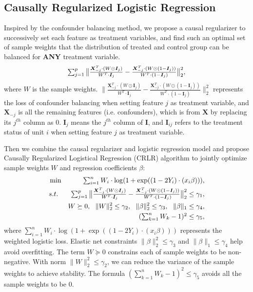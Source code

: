 \documentclass[sigconf]{acmart}
\newcommand*{\Scale}[2][4]{\scalebox{#1}{$#2$}}
\begin{document}
\subsection{Causally Regularized Logistic Regression}\label{sec:CRLR}
Inspired by the confounder balancing method, we propose a causal regularizer to successively set each feature as treatment variables, and find such an optimal set of sample weights that the distribution of treated and control group can be balanced for \textbf{ANY} treatment variable.
\begin{eqnarray}
    \label{causal_regularizer}
    \Scale[1.0]{\sum_{j=1}^{p} \big\|\frac{\bm{X}_{-j}^{T}\cdot(W\odot \bm{I}_j)}{W^{T}\cdot \bm{I}_j}-\frac{\bm{X}_{-j}^{T}\cdot(W\odot (1-\bm{I}_j))}{W^{T}\cdot (1-\bm{I}_j)}\big\|_2^2},
\end{eqnarray}
where $W$ is the sample weights. 
$\big\|\frac{\bm{X}_{-j}^{T}\cdot(W\odot \bm{I}_j)}{W^{T}\cdot \bm{I}_j}-\frac{\bm{X}_{-j}^{T}\cdot(W\odot (1-\bm{I}_j))}{W^{T}\cdot (1-\bm{I}_j)}\big\|_2^2$ represents the loss of confounder balancing when setting feature $j$ as treatment variable, and $\bm{X}_{-j}$ is all the remaining features (i.e. confounders), which is from $\bm{X}$ by replacing its $j^{th}$ column as $0$.
$\bm{I}_j$ means the $j^{th}$ column of $\bm{I}$, and $\bm{I}_{ij}$ refers to the treatment status of unit $i$ when setting feature $j$ as treatment variable.

Then we combine the causal regularizer and logistic regression model and propose Causally Regularized Logistical Regression (CRLR) algorithm to jointly optimize sample weights $W$ and regression coefficients $\beta$:
\begin{eqnarray}
\label{eq:causal_classification_model}
&\min& \Scale[1.0]{\sum_{i=1}^{n}W_i\cdot \log(1+\exp((1-2Y_i)\cdot (x_i\beta)))},\\
\nonumber &s.t.& \Scale[1.0]{\sum_{j=1}^{p} \big\|\frac{\bm{X}_{-j}^{T}\cdot(W\odot \bm{I}_j)}{W^{T}\cdot \bm{I}_j}-\frac{\bm{X}_{-j}^{T}\cdot(W\odot (1-\bm{I}_j))}{W^{T}\cdot (1-\bm{I}_j)}\big\|_2^2 \leq \gamma_1},\\
\nonumber   &\quad& W\succeq 0, \ \ \|W\|_2^2 \leq \gamma_2, \ \  \|\beta\|_2^2 \leq \gamma_3, \ \  \|\beta\|_1 \leq \gamma_4,\\
\nonumber &\quad& \Scale[1.0]{(\sum_{k=1}^{n}W_k-1)^{2} \leq \gamma_5},
\end{eqnarray}
where $\sum_{i=1}^{n}W_i\cdot \log(1+\exp((1-2Y_i)\cdot (x_i\beta)))$ represents the weighted logistic loss. 
Elastic net constraints $\|\beta\|_2^2\leq \gamma_3$ and $\|\beta\|_1\leq \gamma_4$ help avoid overfitting.
The term $W\succeq 0$ constrains each of sample weights to be non-negative.
With norm $\|W\|_2^2\leq \gamma_2$, we can reduce the variance of the sample weights to achieve stability.
The formula $(\sum_{k=1}^{n}W_k-1)^{2} \leq \gamma_5$ avoids all the sample weights to be $0$.
\end{document}
